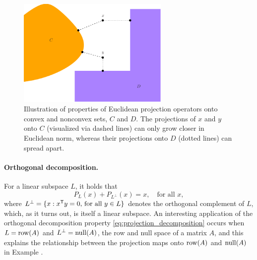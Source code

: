 \begin{figure}[tb]
\centering
\includegraphics[width=0.65\textwidth]{fig/projection.pdf}
\caption{Illustration of properties of Euclidean projection operators onto 
  convex and nonconvex sets, $C$ and $D$. The projections of $x$ and $y$ onto
  $C$ (visualized via dashed lines) can only grow closer in Euclidean norm,
  whereas their projections onto  $D$ (dotted lines) can spread apart.}    
\label{fig:projection}
\end{figure}

\paragraph{Orthogonal decomposition.}

For a linear subspace $L$, it holds that
\begin{equation}
\label{eq:projection_decomposition}
P_L(x) + P_{L^\perp}(x) = x, \quad \text{for all $x$},
\end{equation}
where $L^\perp = \{x : x^{\mathsf{T}} y = 0, \, \text{for all $y \in L$} \}$ denotes the
orthogonal complement of $L$, which, as it turns out, is itself a linear
subspace. An interesting application of the orthogonal decomposition property
\eqref{eq:projection_decomposition} occurs when $L = \operatorname{row}(A)$ and $L^\perp =
\operatorname{null}(A)$, the row and null space of a matrix $A$, and this explains the
relationship between the projection maps onto $\operatorname{row}(A)$ and $\operatorname{null}(A)$ in Example
. 

